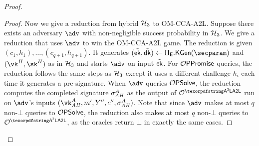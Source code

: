\begin{proof}
\begin{proof}
        
        
        Now we give a reduction from hybrid $\mathcal{H}_3$ to OM-CCA-A2L. Suppose there exists an adversary $\adv$ with non-negligible success probability in $\mathcal{H}_3$. We give a reduction that uses $\adv$ to win the OM-CCA-A2L game. The reduction is given $(c_1,h_1),\ldots,(c_{q+1},h_{q+1})$. It generates $(\tilde\ek,\tilde\dk) \gets \Pi_\ENC.\kgen(\secparam)$ and $(\vk^H,\sk^H)$ as in $\mathcal{H}_3$ and starts $\adv$ on input $\tilde{\mathsf{ek}}$. For $\mathcal{O}\mathsf{PPromise}$ queries, the reduction follows the same steps as $\mathcal{H}_3$ except it uses a different challenge $h_i$ each time it generates a pre-signature. When $\adv$ queries $\mathcal{O}\mathsf{PSolve}$, the reduction computes the completed signature $\sigma_{\mathit{AH}}^A$ as the output of $\oracle^\AAL$ run on $\adv$'s inputs $(\vk_\ah^A,m',Y'',c'',\sigma_\ah^A)$. Note that since $\adv$ makes at most $q$ non-$\bot$ queries to $\mathcal{O}\mathsf{PSolve}$, the reduction also makes at most $q$ non-$\bot$ queries to $\oracle^\AAL$, as the oracles return $\bot$ in exactly the same cases.
        

\end{proof}
\end{proof}
